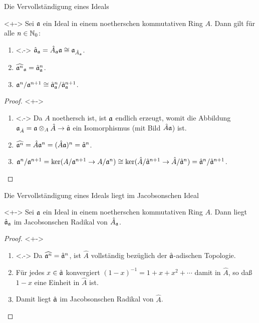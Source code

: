\begin{frame}{Die Vervollständigung eines Ideals}
	\begin{proposition}<+->
		Sei \(\mathfrak{a}\) ein Ideal in einem noetherschen kommutativen Ring \(A\).
		Dann gilt für alle \(n \in \mathbb N_0\):
		\begin{enumerate}[<+->]
		\item<.->
			\(\hat{\mathfrak{a}}_{\mathfrak{a}} = \hat A_{\mathfrak{a}} \mathfrak{a}
			\cong {\mathfrak{a}}_{\hat A_{\mathfrak{a}}}\).
		\item
			\(\widehat{\mathfrak{a}^n}_{\mathfrak{a}} = {\hat{\mathfrak{a}}_{\mathfrak{a}}}^n\).
		\item
			\(\mathfrak{a}^n/\mathfrak{a}^{n + 1}
			\cong \hat{\mathfrak{a}}_{\mathfrak{a}}^n/\hat{\mathfrak{a}}_{\mathfrak{a}}^{n + 1}\).
		\end{enumerate}
	\end{proposition}
	\begin{proof}<+->
		\begin{enumerate}[<+->]
		\item<.->
			Da \(A\) noethersch ist, ist \(\mathfrak{a}\) endlich erzeugt, womit
			die Abbildung \(\mathfrak{a}_{\hat A} = \mathfrak{a} \otimes_A \hat A \to
			\hat {\mathfrak{a}}\) ein Isomorphismus (mit Bild \(\hat A \mathfrak{a}\)) ist.
		\item
			\(\widehat{\mathfrak{a}^n} = \hat A \mathfrak{a}^n = (\hat A \mathfrak{a})^n
			= \hat{\mathfrak{a}}^n\).
		\item
			\(\mathfrak{a}^n/\mathfrak{a}^{n + 1} = \ker(A/\mathfrak{a}^{n + 1} \to
			A/\mathfrak{a}^n) \cong \ker (\hat A/\hat{\mathfrak{a}}^{n + 1} \to
			\hat A/\hat{\mathfrak{a}}^n) = \hat{\mathfrak{a}}^n/\hat{\mathfrak{a}}^{n + 1}\).
			\qedhere
		\end{enumerate}
	\end{proof}
\end{frame}

\begin{frame}{Die Vervollständigung eines Ideals liegt im Jacobsonschen Ideal}
	\begin{proposition}<+->
		Sei \(\mathfrak{a}\) ein Ideal in einem noetherschen kommutativen Ring
		\(A\). Dann liegt \(\hat{\mathfrak{a}}_{\mathfrak{a}}\) im Jacobsonschen
		Radikal von \(\hat A_{\mathfrak{a}}\).
	\end{proposition}
	\begin{proof}<+->
		\begin{enumerate}[<+->]
		\item<.->
			Da \(\widehat{\mathfrak{a}^n} = \hat{\mathfrak{a}}^n\), ist
			\(\hat A\) vollständig bezüglich der \(\hat{\mathfrak{a}}\)-adischen
			Topologie.
		\item
			Für jedes \(x \in \hat{\mathfrak{a}}\) konvergiert
			\((1 - x)^{-1} = 1 + x + x^2 + \dotsb\) damit in \(\hat A\), so
			daß \(1 - x\) eine Einheit in \(\hat A\) ist.
		\item
			Damit liegt \(\hat{\mathfrak{a}}\) im Jacobsonschen Radikal von \(\hat A\).
			\qedhere
		\end{enumerate}
	\end{proof}
\end{frame}


